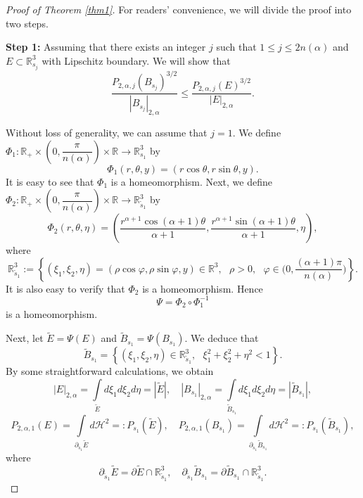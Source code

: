 \documentclass[10pt,a4paper]{amsart}
\begin{document}
	\begin{proof}[Proof of Theorem \ref{thm1}]
		For readers' convenience, we will divide the proof into two steps.
		
		\noindent\textbf{Step 1:} Assuming that there exists an integer $j$ such that $1\leq j\leq 2n(\alpha)$ and $E \subset \mathbb{R}^3_{s_j}$ with Lipschitz boundary. We will show that
		\begin{equation}\label{eqn6}
			\dfrac{P_{2,\alpha,j}(B_{s_j})^{3/2}}{|B_{s_j}|_{2,\alpha}} \leq \dfrac{P_{2,\alpha,j}(E)^{3/2}}{|E|_{2,\alpha}}.
		\end{equation}
		
		Without loss of generality, we can assume that $j=1$. We define $\Phi_1: \mathbb{R}_+ \times \left( 0, \dfrac{\pi}{n(\alpha)} \right) \times \mathbb{R} \to \mathbb{R}^3_{s_1}$ by
		$$ \Phi_1 (r, \theta, y) = (r\cos \theta, r\sin \theta, y).$$
		It is easy to see that $\Phi_1$ is a homeomorphism. Next, we define $\Phi_2: \mathbb{R}_+ \times \left( 0, \dfrac{\pi}{n(\alpha)} \right) \times \mathbb{R} \to \mathbb{R}^3_{\widetilde{s}_1}$ by
		$$ \Phi_2 (r, \theta, \eta) = \left(\dfrac{r^{\alpha+1}\cos (\alpha+1)\theta}{\alpha+1}, \dfrac{r^{\alpha+1}\sin(\alpha+1)\theta}{\alpha+1}, \eta\right), $$
		where
		$$\mathbb{R}^3_{\widetilde{s}_1} := \left\{(\xi_1,\xi_2,\eta) = (\rho\cos\varphi, \rho\sin\varphi, y) \in \mathbb{R}^3, \textrm{ } \rho >0, \textrm{ } \varphi \in \Big(0,\frac{(\alpha+1)\pi}{n(\alpha)}\Big) \right\}.$$
		It is also easy to verify that $\Phi_2$ is a homeomorphism. Hence
		$$ \Psi = \Phi_2 \circ \Phi_1^{-1} $$
		is a homeomorphism. 
		
		Next, let $\widetilde{E} = \Psi (E)$ and $\widetilde{B}_{s_1} = \Psi(B_{s_1})$. We deduce that
		$$ \widetilde{B}_{s_1} = \left\{ (\xi_1, \xi_2, \eta) \in \mathbb{R}^3_{\widetilde{s}_1}, \textrm{ } \xi_1^2 + \xi_2^2 + \eta^2 < 1\right\}.$$
		By some straightforward calculations, we obtain
		$$ |E|_{2,\alpha} = \int\limits_{\widetilde{E}} d\xi_1d\xi_2d\eta = |\widetilde{E}|, \quad |B_{s_1}|_{2,\alpha} = \int\limits_{\widetilde{B}_{s_1}} d\xi_1d\xi_2d\eta = |\widetilde{B}_{s_1}|, $$
		$$ P_{2,\alpha,1} (E) = \int\limits_{\partial_{\widetilde{s}_1} \widetilde{E}} d\mathcal{H}^2 =: P_{s_1}(\widetilde{E}), \quad P_{2,\alpha,1} (B_{s_1}) = \int\limits_{\partial_{\widetilde{s}_1} \widetilde{B}_{s_1}} d\mathcal{H}^2 =: P_{s_1}( \widetilde{B}_{s_1}),$$
		where
		$$ \partial_{\widetilde{s}_1} \widetilde{E} = \partial \widetilde{E} \cap \mathbb{R}^3_{\widetilde{s}_1}, \quad \partial_{\widetilde{s}_1} \widetilde{B}_{s_1} = \partial \widetilde{B}_{s_1} \cap \mathbb{R}^3_{\widetilde{s}_1}.$$
		

\end{proof}
\end{document}
